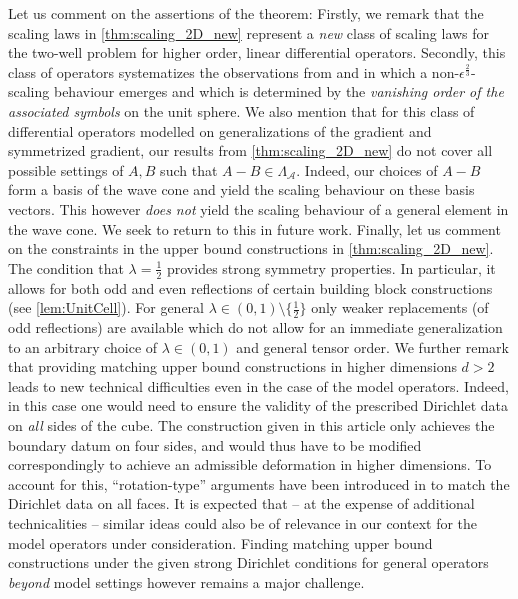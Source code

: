 \documentclass[a4paper, 10pt, twoside, notitlepage]{amsart}
\theoremstyle{plain}
\newcommand{\A}{\mathcal{A}}
\begin{document}
	Let us comment on the assertions of the theorem: Firstly, we remark that the scaling laws in \cref{thm:scaling_2D_new} represent a \emph{new} class of scaling laws for the two-well
	problem for higher order, linear differential operators. Secondly, this class of operators systematizes the observations from \cite{CC15} and \cite[Section 3.4]{RRT23} in which a
	non-$\epsilon^{\frac{2}{3}}$-scaling behaviour emerges and which is determined by the \emph{vanishing order of the associated symbols} on the unit sphere.
        We also mention that for this class of differential operators modelled on generalizations of the gradient and symmetrized gradient, our results from \cref{thm:scaling_2D_new} do not
	cover all possible settings of $A,B $ such that $A-B \in \Lambda_{\A}$. Indeed, our choices of $A-B$ form a basis of the wave cone and yield the scaling behaviour on these basis
	vectors. This however \emph{does not} yield the scaling behaviour of a general element in the wave cone. We seek to return to this in future work. 
	Finally, let us comment on the constraints in the upper bound constructions in \cref{thm:scaling_2D_new}. The condition that $\lambda = \frac{1}{2}$ provides strong symmetry properties. In particular, it allows for both odd and even reflections of certain building block constructions (see \cref{lem:UnitCell}). For general $\lambda \in (0,1)\setminus \{\frac{1}{2}\}$ only weaker replacements (of odd reflections) are available which do not allow for an immediate generalization to an arbitrary choice of $\lambda \in (0,1)$ and general tensor order. We further remark that providing matching upper bound constructions in higher dimensions $d>2$ leads to new technical difficulties even in the case of the model operators. Indeed, in this case one would need to ensure the validity of the prescribed Dirichlet data on \emph{all} sides of the cube. The construction given in this article only achieves the boundary datum on four sides, and would thus have to be modified correspondingly to achieve an admissible deformation in higher dimensions. To account for this, ``rotation-type'' arguments have been introduced in \cite{RRT23,RTrib22} to match the Dirichlet data on all faces. It is expected that -- at the expense of additional technicalities -- similar ideas could also be of relevance in our context for the model operators under consideration. Finding matching upper bound constructions under the given strong Dirichlet conditions for general operators \emph{beyond} model settings however remains a major challenge.
\end{document}
